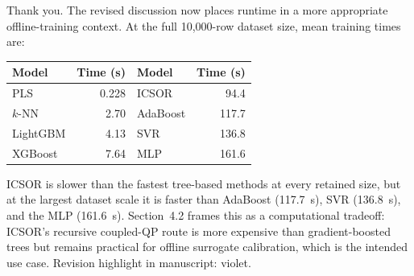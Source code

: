 \documentclass[a4paper,11pt]{article}
\newcommand{\revhighlight}[2]{\textcolor{#1}{Revision highlight in manuscript: #2.}}
\begin{document}
Thank you. The revised discussion now places runtime in a more appropriate offline-training context. At the full 10,000-row dataset size, mean training times are:

\begin{center}
\small
\begin{tabular}{lrlr}
\toprule
Model & Time (s) & Model & Time (s) \\
\midrule
PLS & 0.228 & ICSOR & 94.4 \\
$k$-NN & 2.70 & AdaBoost & 117.7 \\
LightGBM & 4.13 & SVR & 136.8 \\
XGBoost & 7.64 & MLP & 161.6 \\
\bottomrule
\end{tabular}
\end{center}

ICSOR is slower than the fastest tree-based methods at every retained size, but at the largest dataset scale it is faster than AdaBoost (117.7~s), SVR (136.8~s), and the MLP (161.6~s). Section~4.2 frames this as a computational tradeoff: ICSOR's recursive coupled-QP route is more expensive than gradient-boosted trees but remains practical for offline surrogate calibration, which is the intended use case. \revhighlight{revRtwoFive}{violet}
\end{document}
